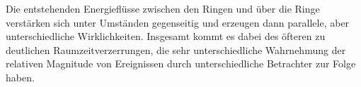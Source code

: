 \begin{newstuff}
        Die entstehenden Energieflüsse zwischen den Ringen und über die Ringe verstärken sich unter Umständen gegenseitig und erzeugen dann parallele, aber unterschiedliche Wirklichkeiten. Insgesamt kommt es dabei des öfteren zu deutlichen Raumzeitverzerrungen, die sehr unterschiedliche Wahrnehmung der relativen Magnitude von Ereignissen durch unterschiedliche Betrachter zur Folge haben.
    \end{newstuff}